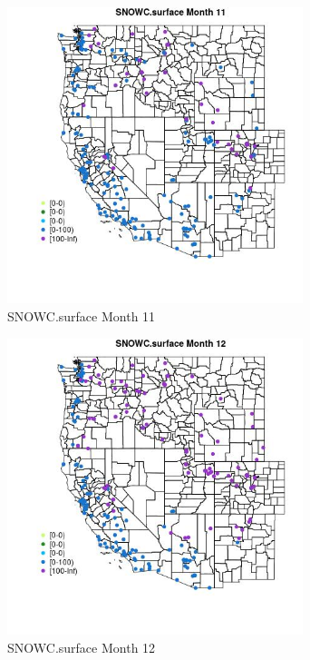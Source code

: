 \begin{figure} 
\centering  
\includegraphics[width=0.77\textwidth]{Code_Outputs/Report_ML_input_PM25_Step4_part_e_de_duplicated_aveswNAs_MapObsMo11SNOWCsurface.jpg} 
\caption{\label{fig:Report_ML_input_PM25_Step4_part_e_de_duplicated_aveswNAsMapObsMo11SNOWCsurface}SNOWC.surface Month 11} 
\end{figure} 
 

\clearpage 

\begin{figure} 
\centering  
\includegraphics[width=0.77\textwidth]{Code_Outputs/Report_ML_input_PM25_Step4_part_e_de_duplicated_aveswNAs_MapObsMo12SNOWCsurface.jpg} 
\caption{\label{fig:Report_ML_input_PM25_Step4_part_e_de_duplicated_aveswNAsMapObsMo12SNOWCsurface}SNOWC.surface Month 12} 
\end{figure} 
 

